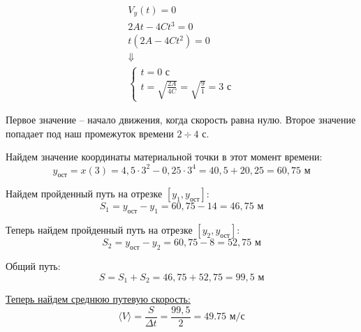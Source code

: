 \documentclass[17pt]{extarticle}
\begin{document}
$$
\begin{gathered}
V_y(t) = 0 \\
2At - 4Ct^3 = 0 \\
t(2A - 4Ct^2) = 0 \\
\Downarrow \\
\begin{cases}
	t = 0 \text{ с}\\
	t = \sqrt{\frac{2A}{4C}} = \sqrt{\frac{9}{1}} = 3 \text{ с}
\end{cases}
\end{gathered}
$$

Первое значение -- начало движения, когда скорость равна нулю. Второе значение попадает под наш промежуток времени $2\div4$ с.

Найдем значение координаты материальной точки в этот момент времени:
$$
y_\text{ост} = x(3) = 4,5 \cdot 3^2 - 0,25 \cdot 3^4 = 40,5 + 20,25 = 60,75 \text{ м}
$$

Найдем пройденный путь на отрезке $[y_1,y_\text{ост}]$:
$$
S_1 = y_\text{ост} - y_1 = 60,75 - 14 = 46,75 \text{ м}
$$

Теперь найдем пройденный путь на отрезке $[y_2,y_\text{ост}]$:
$$
S_2 = y_\text{ост} - y_2 = 60,75 - 8 = 52,75 \text{ м}
$$

Общий путь:
$$
S = S_1 + S_2 = 46,75 + 52,75 = 99,5 \text{ м}
$$

\uline{Теперь найдем среднюю путевую скорость:}
$$
\langle V \rangle = \frac{S}{\Delta t} = \frac{99,5}{2} = 49.75 \text{ м/с}
$$
\end{document}

